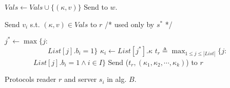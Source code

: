 \begin{algorithm}[!ht]
\begin{algorithmic}[3]
\begin{multicols}{1}
{{                       \State   $Vals \gets   Vals \cup \{({\kappa}, v)\}$ 
              \State  Send {\ackTag} to $w$.
            }\EndPart
            \Statex
            \EndPart
                   
                        \Statex
             {
              \State   Send $v_i$ s.t. $({\kappa}, v) \in Vals$  to  $r$
            }\EndPart 
          \Statex\Statex   /* used only by $s^*$ */
          
           {
                     \State $j^* \leftarrow \max \{ j :$ 
                      \\~~~~~~~~~~~~$ List[j].b_i =1 \}$
                     \State ${\kappa}_i \leftarrow List[j^*].{\kappa}$
           \EndFor 
            \Statex
             \State  $t_r \triangleq \max_{1 \leq j \leq |List|} \{j:$
             \\~~~~~~~~$List[j].b_i = 1 \wedge i \in I\}$ 
            \State  Send  ($t_r, ({\kappa}_1,{\kappa}_2, \cdots, {\kappa}_k)$) to $r$
            }\EndPart       
          }\end{multicols}
        \end{algorithmic} 
        \caption{Protocols reader $r$ and server $s_i$ in alg. $B$.}\label{fig:algo_b}
                  \vspace{-1.2em}
\end{algorithm}




